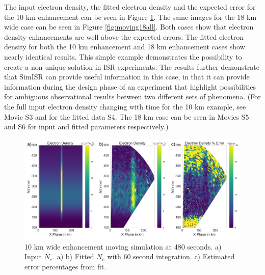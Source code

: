\documentclass[draft,ras]{agutex}
\begin{document}
\begin{article}
The input electron density, the fitted electron density and the expected error for the 10 km enhancement can be seen in Figure \ref{fig:moving10all}. The same images for the 18 km wide case can be seen in Figure \ref{fig:moving18all}. Both cases show that electron density enhancements are well above the expected errors.
The fitted electron density for both the 10 km enhancement and 18 km enhancement cases show nearly identical results. This simple example demonstrates the possibility to create a non-unique solution in ISR experiments. The results further demonstrate that SimISR can provide useful information in this case, in that it can provide information during the design phase of an experiment that highlight possibilities for ambiguous observational results between two different sets of phenomena. (For the full input electron density changing with time for the 10 km example, see Movie S3 and for the fitted data S4. The 18 km case can be seen in Movies S5 and S6 for input and fitted parameters respectively.)

\begin{figure}[!t]
\centering
\includegraphics[width=6in]{moving10kminouterr}
\caption{10 km wide enhancement moving simulation at 480 seconds. a) Input $N_e$. a)  b) Fitted $N_e$ with 60 second integration. c) Estimated error percentages from fit.}
\label{fig:moving10all}
\end{figure}


\end{article}
\end{document}
